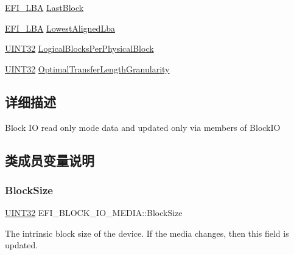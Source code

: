 \begin{DoxyCompactItemize}
\item 
\hyperlink{_uefi_base_type_8h_a3495b0e526b2172f98d5bde00bf28b72}{E\+F\+I\+\_\+\+L\+BA} \hyperlink{struct_e_f_i___b_l_o_c_k___i_o___m_e_d_i_a_a41a91daab23393f8b2eb78293d7b32f4}{Last\+Block}
\item 
\hyperlink{_uefi_base_type_8h_a3495b0e526b2172f98d5bde00bf28b72}{E\+F\+I\+\_\+\+L\+BA} \hyperlink{struct_e_f_i___b_l_o_c_k___i_o___m_e_d_i_a_ae5aeaa551786c3bfda21f88f3f152943}{Lowest\+Aligned\+Lba}
\item 
\hyperlink{_processor_bind_8h_ae1e6edbbc26d6fbc71a90190d0266018}{U\+I\+N\+T32} \hyperlink{struct_e_f_i___b_l_o_c_k___i_o___m_e_d_i_a_a0a6d342e079f42291da054595bf5a40e}{Logical\+Blocks\+Per\+Physical\+Block}
\item 
\hyperlink{_processor_bind_8h_ae1e6edbbc26d6fbc71a90190d0266018}{U\+I\+N\+T32} \hyperlink{struct_e_f_i___b_l_o_c_k___i_o___m_e_d_i_a_a703097ebf35d23eae45d941134b7ad9c}{Optimal\+Transfer\+Length\+Granularity}
\end{DoxyCompactItemize}


\subsection{详细描述}
Block IO read only mode data and updated only via members of Block\+IO 

\subsection{类成员变量说明}
\mbox{\label{struct_e_f_i___b_l_o_c_k___i_o___m_e_d_i_a_a2e70f9bd2806fefdfa6d56b2d4f64a8d}} 
\subsubsection{\texorpdfstring{Block\+Size}{BlockSize}}
{\footnotesize\ttfamily \hyperlink{_processor_bind_8h_ae1e6edbbc26d6fbc71a90190d0266018}{U\+I\+N\+T32} E\+F\+I\+\_\+\+B\+L\+O\+C\+K\+\_\+\+I\+O\+\_\+\+M\+E\+D\+I\+A\+::\+Block\+Size}

The intrinsic block size of the device. If the media changes, then this field is updated. \mbox{\label{struct_e_f_i___b_l_o_c_k___i_o___m_e_d_i_a_a084b56a43a70914b1de64b1076ffacef}} 

